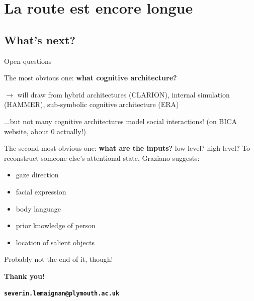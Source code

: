 \documentclass[compress]{beamer}
\begin{document}
\section{La route est encore longue}
\subsection{What's next?}
\begin{frame}{Open questions}

    The most obvious one: {\bf what cognitive architecture?}

    $\rightarrow$ will draw from hybrid architectures (CLARION), internal
    simulation (HAMMER), sub-symbolic cognitive architecture (ERA)

    ...but not many cognitive architectures model social interactions! (on BICA
    website, about 0 actually!)

    \pause
    
    The second most obvious one: {\bf what are the inputs?} low-level?
    high-level? To reconstruct someone else's attentional state, Graziano suggests:

    \begin{itemize}
        \item gaze direction
        \item facial expression
        \item body language
        \item prior knowledge of person
        \item location of salient objects
    \end{itemize}

    Probably not the end of it, though!

\end{frame}





{
\begin{frame}[plain]{}

    {\bf Thank you!}

    {\bf\tt\scriptsize severin.lemaignan@plymouth.ac.uk}

\end{frame}
}
\end{document}
